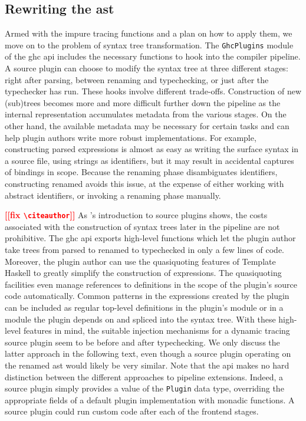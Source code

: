 \documentclass[thesis=B,english]{FITthesis}[2019/12/23]
\newcommand{\todo}[1]{\textcolor{red}{\textbf{[[#1]]}}}
\newcommand{\hsType}[1]{\texttt{#1}}
\newcommand{\hsModule}[1]{\texttt{#1}}
\begin{document}
\subsection*{Rewriting the \acrshort{ast}}
Armed with the impure tracing functions and a plan on how to apply them, we
move on to the problem of syntax tree transformation. The \hsModule{GhcPlugins}
module\cite{hkg-ghcplugins} of the \acrshort{ghc} \acrshort{api} includes the
necessary functions to hook into the compiler pipeline. A source plugin can
choose to modify the syntax tree at three different stages: right after
parsing, between renaming and typechecking, or just after the typechecker has
run. These hooks involve different trade-offs. Construction of new (sub)trees
becomes more and more difficult further down the pipeline as the internal
representation accumulates metadata from the various stages. On the other hand,
the available metadata may be necessary for certain tasks and can help plugin
authors write more robust implementations. For example, constructing parsed
expressions is almost as easy as writing the surface syntax in a source file,
using strings as identifiers, but it may result in accidental captures of
bindings in scope. Because the renaming phase disambiguates identifiers,
constructing renamed  avoids this issue, at the expense of
either working with abstract identifiers, or invoking a renaming phase
manually.

\todo{fix \texttt{\textbackslash citeauthor}}
As \citeauthor{blog-source-plugins}'s introduction to source plugins shows, the
costs associated with the construction of syntax trees later in the pipeline
are not prohibitive\cite{blog-source-plugins}. The \acrshort{ghc}
\acrshort{api} exports high-level functions which let the plugin author take
trees from parsed to renamed to typechecked in only a few lines of code.
Moreover, the plugin author can use the quasi\-quoting
features\cite{th-quasiquoting} of Template Haskell\cite{th-classic} to greatly
simplify the construction of expressions. The quasi\-quoting facilities even
manage references to definitions in the scope of the plugin's source code
automatically. Common patterns in the expressions created by the plugin can be
included as regular top-level definitions in the plugin's module or in a module
the plugin depends on and spliced into the syntax tree. With these high-level
features in mind, the suitable injection mechanisms for a dynamic tracing
source plugin seem to be before and after typechecking. We only discuss the
latter approach in the following text, even though a source plugin operating on
the renamed \acrshort{ast} would likely be very similar. Note that the
\acrshort{api} makes no hard distinction between the different approaches to
pipeline extensions. Indeed, a source plugin simply provides a value of the
\hsType{Plugin} data type, overriding the appropriate fields of a default
plugin implementation with monadic functions. A source plugin could run custom
code after each of the frontend stages.
\end{document}
